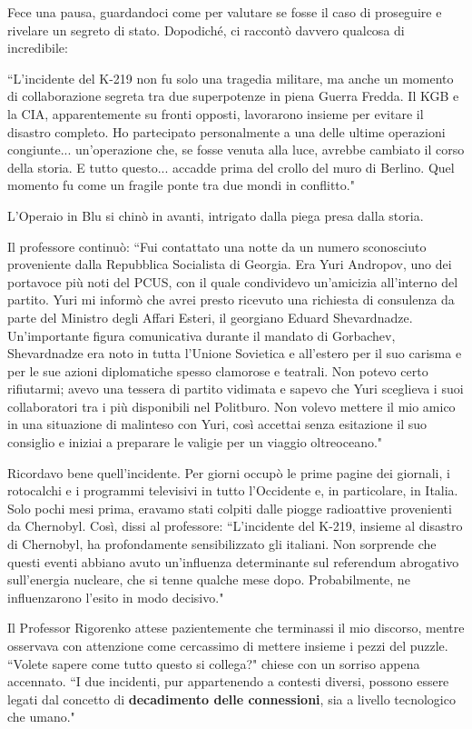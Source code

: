 \documentclass[12pt,b5paper]{article}
\begin{document}
Fece una pausa, guardandoci come per valutare se fosse il caso di
proseguire e rivelare un segreto di stato. Dopodiché, ci raccontò davvero qualcosa di incredibile:

``L'incidente del K-219 non fu solo una tragedia militare, ma anche un momento di
collaborazione segreta tra due superpotenze in piena Guerra Fredda. Il KGB e la
CIA, apparentemente su fronti opposti, lavorarono insieme per evitare il
disastro completo. Ho partecipato personalmente a una delle ultime operazioni
congiunte... un'operazione che, se fosse venuta alla luce, avrebbe cambiato il
corso della storia. E tutto questo... accadde prima del crollo del muro di
Berlino. Quel momento fu come un fragile ponte tra due mondi in conflitto."

L'Operaio in Blu si chinò in avanti, intrigato dalla piega presa dalla storia.

Il professore continuò: ``Fui contattato una notte da un numero sconosciuto
proveniente dalla Repubblica Socialista di Georgia. Era Yuri Andropov, uno dei
portavoce più noti del PCUS, con il quale condividevo un'amicizia all'interno
del partito. Yuri mi informò che avrei presto ricevuto una richiesta di
consulenza da parte del Ministro degli Affari Esteri, il georgiano Eduard
Shevardnadze. Un'importante figura comunicativa durante il mandato di Gorbachev,
Shevardnadze era noto in tutta l'Unione Sovietica e all'estero per il suo carisma
e per le sue azioni diplomatiche spesso clamorose e teatrali. Non potevo certo
rifiutarmi; avevo una tessera di partito vidimata e sapevo che Yuri sceglieva i
suoi collaboratori tra i più disponibili nel Politburo. Non volevo mettere il
mio amico in una situazione di malinteso con Yuri, così accettai senza
esitazione il suo consiglio e iniziai a preparare le valigie per un viaggio
oltreoceano."

Ricordavo bene quell'incidente. Per giorni occupò le prime pagine dei giornali,
i rotocalchi e i programmi televisivi in tutto l'Occidente e, in particolare,
in Italia. Solo pochi mesi prima, eravamo stati colpiti dalle piogge radioattive
provenienti da Chernobyl. Così, dissi al professore: ``L'incidente del K-219,
insieme al disastro di Chernobyl, ha profondamente sensibilizzato gli italiani.
Non sorprende che questi eventi abbiano avuto un'influenza determinante sul
referendum abrogativo sull'energia nucleare, che si tenne qualche mese dopo.
Probabilmente, ne influenzarono l'esito in modo decisivo."

Il Professor Rigorenko attese pazientemente che terminassi il mio discorso,
mentre osservava con attenzione come cercassimo di mettere insieme i pezzi
del puzzle. ``Volete sapere come tutto questo si collega?" chiese con un sorriso
appena accennato. ``I due incidenti, pur appartenendo a contesti diversi,
possono essere legati dal concetto di \textbf{decadimento delle connessioni},
sia a livello tecnologico che umano."
\end{document}
